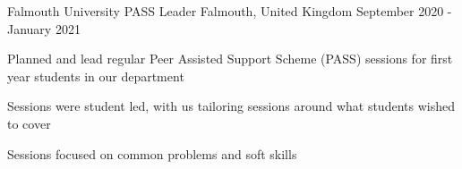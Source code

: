 

\begin{cventries}

  \cventry
    {Falmouth University} %
    {PASS Leader} %
    {Falmouth, United Kingdom} %
    {September 2020 - January 2021} %
    {
      \begin{cvitems} %
        \item Planned and lead regular Peer Assisted Support Scheme (PASS) sessions for first year students in our department
        \item Sessions were student led, with us tailoring sessions around what students wished to cover
        \item Sessions focused on common problems and soft skills
      \end{cvitems}
    }

\end{cventries}
